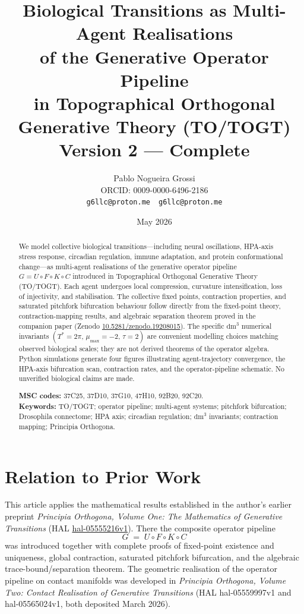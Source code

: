 \documentclass[12pt,a4paper]{article}
\title{Biological Transitions as Multi-Agent Realisations\\
       of the Generative Operator Pipeline\\
       in Topographical Orthogonal Generative Theory (TO/TOGT)\\[6pt]
       \large Version 2 — Complete}
\author{Pablo Nogueira Grossi\\[4pt]
  \small ORCID: 0009-0000-6496-2186\\
  \small \texttt{g6llc@proton.me}\ \ \texttt{g6llc@proton.me}}
\date{May 2026}
\newcommand{\dmcube}{\mathrm{dm}^3}
\begin{document}
\maketitle
\thispagestyle{empty}

\begin{abstract}
We model collective biological transitions—including neural oscillations,
HPA-axis stress response, circadian regulation, immune adaptation, and protein
conformational change—as multi-agent realisations of the generative operator
pipeline $G = U \circ F \circ K \circ C$ introduced in Topographical Orthogonal
Generative Theory (TO/TOGT).  Each agent undergoes local compression, curvature
intensification, loss of injectivity, and stabilisation.  The collective fixed
points, contraction properties, and saturated pitchfork bifurcation behaviour
follow directly from the fixed-point theory, contraction-mapping results, and
algebraic separation theorem proved in the companion paper
(Zenodo \href{https://doi.org/10.5281/zenodo.19208015}{10.5281/zenodo.19208015}).
The specific $\dmcube$ numerical invariants
$(T^{*}=2\pi,\,\mu_{\max}=-2,\,\tau=2)$ are convenient modelling choices
matching observed biological scales; they are not derived theorems of the
operator algebra.  Python simulations generate four figures illustrating
agent-trajectory convergence, the HPA-axis bifurcation scan, contraction
rates, and the operator-pipeline schematic.  No unverified biological claims
are made.

\medskip\noindent
\textbf{MSC codes:} 37C25, 37D10, 37G10, 47H10, 92B20, 92C20.\\
\textbf{Keywords:} TO/TOGT; operator pipeline; multi-agent systems; pitchfork
bifurcation; Drosophila connectome; HPA axis; circadian regulation;
$\dmcube$ invariants; contraction mapping; Principia Orthogona.
\end{abstract}

\tableofcontents
\newpage

\section{Relation to Prior Work}
\label{sec:prior}

This article applies the mathematical results established in the author's
earlier preprint \emph{Principia Orthogona, Volume One: The Mathematics of
Generative Transitions}
(HAL \href{https://hal.science/hal-05555216v1}{hal-05555216v1}).
There the composite operator pipeline
\[
  G \;=\; U \circ F \circ K \circ C
\]
was introduced together with complete proofs of fixed-point existence and
uniqueness, global contraction, saturated pitchfork bifurcation, and the
algebraic trace-bound/separation theorem.  The geometric realisation of the
operator pipeline on contact manifolds was developed in \emph{Principia
Orthogona, Volume Two: Contact Realisation of Generative Transitions}
(HAL hal-05559997v1 and hal-05565024v1, both deposited March 2026).
\end{document}
